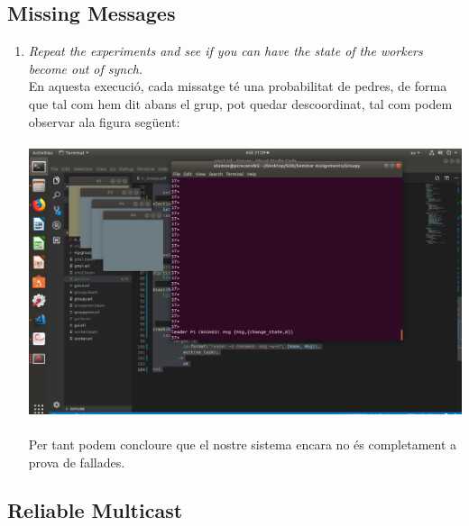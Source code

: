 \documentclass[a4paper, 10pt]{article}
\begin{document}
\newpage\subsection{Missing Messages}
\begin{enumerate}
    \item \textit{Repeat the experiments and see if you can have the state
of the workers become out of synch.}\\En aquesta execució, cada missatge té una probabilitat de pedres, de forma que tal com hem dit abans el grup, pot quedar descoordinat, tal com podem observar ala figura següent:\\\\
\includegraphics[width=\textwidth]{img5.png}\\\\
Per tant podem concloure que el nostre sistema encara no és completament a prova de fallades.
\end{enumerate}
\newpage\subsection{Reliable Multicast}
\end{document}
